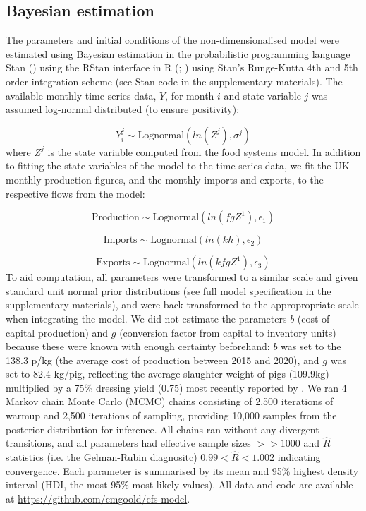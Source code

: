 \documentclass[12pt]{article}
\begin{document}
\subsection{Bayesian estimation}
The parameters and initial conditions of the non-dimensionalised model were estimated using Bayesian estimation in the probabilistic programming language Stan (\cite{carpenter2017}) using the RStan interface in R (\cite{stan2019}; \cite{rcoreteam2020}) using Stan's Runge-Kutta 4th and 5th order integration scheme (see Stan code in the supplementary materials). The available monthly time series data, $Y$, for month $i$ and state variable $j$ was assumed log-normal distributed (to ensure positivity):

\begin{equation}
  Y_{i}^{j} \sim \text{Lognormal}( ln( Z^{j} ), \sigma^{j})
\end{equation}
%
where $Z^{j}$ is the state variable computed from the food systems model. In addition to fitting the state variables of the model to the time series data, we fit the UK monthly production figures, and the monthly imports and exports, to the respective flows from the model:

\begin{equation}
  \text{Production} \sim \text{Lognormal}( ln( f g Z^{1} ), \epsilon_{1})
\end{equation}

\begin{equation}
  \text{Imports} \sim \text{Lognormal}( ln( k h ), \epsilon_{2})
\end{equation}

\begin{equation}
  \text{Exports} \sim \text{Lognormal}( ln( k f g Z^{1} ), \epsilon_{3})
\end{equation}
%
To aid computation, all parameters were transformed to a similar scale and given standard unit normal prior distributions (see full model specification in the supplementary materials), and were back-transformed to the appropropriate scale when integrating the model. We did not estimate the parameters $b$ (cost of capital production) and $g$ (conversion factor from capital to inventory units) because these were known with enough certainty beforehand: $b$ was set to the 138.3 p/kg (the average cost of production between 2015 and 2020), and $g$ was set to 82.4 kg/pig, reflecting the average slaughter weight of pigs (109.9kg) multiplied by a 75\% dressing yield (0.75) most recently reported by \textcite{AHDBpocketbook2018}. We ran 4 Markov chain Monte Carlo (MCMC) chains consisting of 2,500 iterations of warmup and 2,500 iterations of sampling, providing 10,000 samples from the posterior distribution for inference. All chains ran without any divergent transitions, and all parameters had effective sample sizes $>> 1000$ and $\hat{R}$ statistics (i.e. the Gelman-Rubin diagnositc) $0.99 < \hat{R} < 1.002$ indicating convergence. Each parameter is summarised by its mean and 95\% highest density interval (HDI, the most 95\% most likely values). All data and code are available at \href{https://github.com/cmgoold/cfs-model}{https://github.com/cmgoold/cfs-model}.
\end{document}
